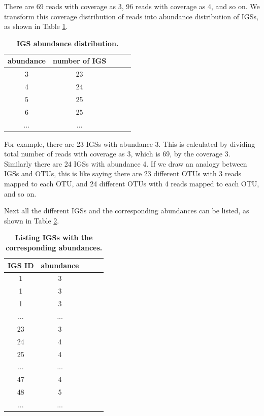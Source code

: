 \documentclass{article}
\begin{document}
There are 69 reads with coverage as 3, 96 reads with coverage as 4, 
and so on. We transform this coverage distribution
of reads into abundance distribution of IGSs, as shown in Table \ref{table:igs_coverage}.

\begin{table}[!ht]
\centering
\begin{tabular}{ |c | c |c| c|c| }
\hline 
abundance & number of IGS \\
\hline 
3                   & 23  \\
4                  & 24  \\
5                  & 25 \\
6        & 25 \\
...        & ... \\
\hline 
\end{tabular}

\caption{\bf IGS abundance distribution.}
\label{table:igs_coverage}
\end{table}

For example, there are 23 IGSs with abundance 3. This is calculated by dividing  
total number of reads with coverage as 3, which is 69, by the coverage 3.
Similarly there are 24 IGSs with abundance 4. 
If we draw an analogy between IGSs and OTUs, this is like saying there are 23 
different OTUs with 3 reads mapped to each OTU, and 24 different OTUs with 4 reads mapped to each OTU, and so on.

Next all the different IGSs and the corresponding abundances can be listed,
as shown in Table \ref{table:igs_abundance}. 

\begin{table}[!ht]
\centering
\begin{tabular}{ |c | c |c| c|c| }
\hline 
IGS ID & abundance \\
\hline 
1                   & 3  \\
1                 & 3  \\
1                  & 3 \\
...        & ... \\
23        & 3 \\
24        & 4 \\
25        & 4 \\
...        & ... \\
47        & 4 \\
48        & 5 \\
...        & ... \\
\hline 
\end{tabular}
\caption{\bf Listing IGSs with the corresponding abundances.}
\label{table:igs_abundance}
\end{table}
\end{document}
